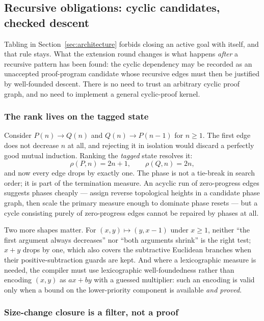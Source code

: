 \subsection{Recursive obligations: cyclic candidates, checked descent}
\label{sec:cycles}

Tabling in Section~\ref{sec:architecture} forbids closing an active goal with
itself, and that rule stays. What the extension round changes is what happens
\emph{after} a recursive pattern has been found: the cyclic dependency may be
recorded as an unaccepted proof-program candidate whose recursive edges must
then be justified by well-founded descent. There is no need to trust an
arbitrary cyclic proof graph, and no need to implement a general cyclic-proof
kernel.

\subsubsection*{The rank lives on the tagged state}

Consider $P(n)\to Q(n)$ and $Q(n)\to P(n-1)$ for $n\ge1$. The first edge does
not decrease $n$ at all, and rejecting it in isolation would discard a perfectly
good mutual induction. Ranking the \emph{tagged} state resolves it:
\[
 \rho(P,n)=2n+1,\qquad \rho(Q,n)=2n,
\]
and now every edge drops by exactly one. The phase is not a tie-break in search
order; it is part of the termination measure. An acyclic run of zero-progress
edges suggests phases cheaply --- assign reverse topological heights in a
candidate phase graph, then scale the primary measure enough to dominate phase
resets --- but a cycle consisting purely of zero-progress edges cannot be
repaired by phases at all.

Two more shapes matter. For $(x,y)\mapsto(y,x-1)$ under $x\ge1$, neither ``the
first argument always decreases'' nor ``both arguments shrink'' is the right
test; $x+y$ drops by one, which also covers the subtractive Euclidean branches
when their positive-subtraction guards are kept. And where a lexicographic
measure is needed, the compiler must use lexicographic well-foundedness rather
than encoding $(x,y)$ as $ax+by$ with a guessed multiplier: such an encoding is
valid only when a bound on the lower-priority component is available \emph{and
proved}.

\subsubsection*{Size-change closure is a filter, not a proof}

